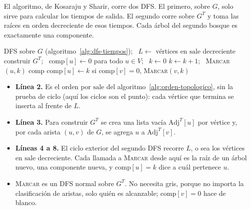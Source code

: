 \documentclass[11pt,letterpaper]{article}
\begin{document}
El algoritmo, de Kosaraju y Sharir, corre dos DFS. El primero, sobre
$G$, solo sirve para calcular los tiempos de salida. El segundo corre
sobre $G^T$ y toma las raíces en orden decreciente de esos tiempos.
Cada árbol del segundo bosque es exactamente una componente.

\begin{algorithm}[H]
\caption{\textsc{Componentes-Fuertes}$(G)$, dos DFS (Kosaraju)}
\label{alg:componentes-fuertes}
\begin{algorithmic}[1]
  \State DFS sobre $G$ (algoritmo~\ref{alg:dfs-tiempos}); \ $L \gets$
         vértices en $\text{sale}$ decreciente
  \State construir $G^T$; \ $\text{comp}[u] \gets 0$ para todo
         $u \in V$; \ $k \gets 0$ 
   
      \State $k \gets k + 1$; \ \textsc{Marcar}$(u, k)$
    \EndIf
  \EndFor
  \State \Return $\text{comp}$
\EndProcedure
\Statex
{} 
  \State $\text{comp}[u] \gets k$
    \State si $\text{comp}[v] = 0$, \textsc{Marcar}$(v, k)$
  \EndFor
\EndProcedure
\end{algorithmic}
\end{algorithm}

\begin{itemize}[itemsep=0.1em]
  \item \textbf{Línea 2.} Es el orden por $\text{sale}$ del
        algoritmo~\ref{alg:orden-topologico}, sin la prueba de ciclo
        (aquí los ciclos son el punto): cada vértice que termina se
        inserta al frente de $L$.
  \item \textbf{Línea 3.} Para construir $G^T$ se crea una lista
        vacía $\text{Adj}^T[u]$ por vértice y, por cada arista $(u, v)$
        de $G$, se agrega $u$ a $\text{Adj}^T[v]$.
  \item \textbf{Líneas 4 a 8.} El ciclo exterior del segundo DFS
        recorre $L$, o sea los vértices en $\text{sale}$ decreciente.
        Cada llamada a \textsc{Marcar} desde aquí es la raíz de un
        árbol nuevo, una componente nueva, y $\text{comp}[u] = k$ dice
        a cuál pertenece $u$.
  \item \textsc{Marcar} es un DFS normal sobre $G^T$. No necesita gris,
        porque no importa la clasificación de aristas, solo quién es
        alcanzable; $\text{comp}[v] = 0$ hace de blanco.
\end{itemize}
\end{document}
